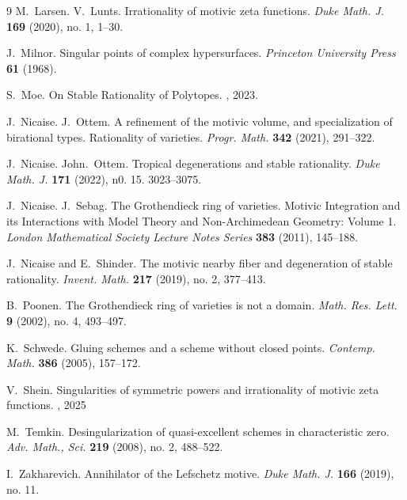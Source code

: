 \documentclass{amsart}
\theoremstyle{definition}
\numberwithin{equation}{section}
\begin{document}
\begin{thebibliography}{9}
M.~Larsen. V.~Lunts. Irrationality of motivic zeta functions. \emph{Duke Math. J.} {\bf 169} (2020), no. 1, 1--30.

J.~Milnor. Singular points of complex hypersurfaces. \emph{Princeton University Press} {\bf 61} (1968).

S.~Moe. On Stable Rationality of Polytopes. , 2023.

J.~Nicaise. J.~Ottem. A refinement of the motivic volume, and specialization of birational types. Rationality of varieties. \emph{Progr. Math.} {\bf 342} (2021), 291--322.

J.~Nicaise. John.~Ottem. Tropical degenerations and stable rationality. \emph{Duke Math. J.} {\bf 171} (2022), n0. 15. 3023--3075.

J.~Nicaise. J.~Sebag. The Grothendieck ring of varieties. Motivic Integration and its Interactions with Model Theory and Non-Archimedean Geometry: Volume 1. \emph{London Mathematical Society Lecture Notes Series} {\bf 383} (2011), 145--188.

J.~Nicaise and E.~Shinder. The motivic nearby fiber and degeneration of stable rationality. \emph{Invent. Math.} {\bf 217} (2019), no. 2, 377--413.

B.~Poonen. The Grothendieck ring of varieties is not a domain. \emph{Math. Res. Lett.} {\bf 9} (2002), no. 4, 493--497.

K.~Schwede. Gluing schemes and a scheme without closed points. \emph{Contemp. Math.} {\bf 386} (2005), 157--172.

V.~Shein.
\newblock Singularities of symmetric powers and irrationality of motivic zeta functions.
, 2025

M.~Temkin. Desingularization of quasi-excellent schemes in characteristic zero. \emph{Adv. Math., Sci.} {\bf 219} (2008), no. 2, 488--522.

I.~Zakharevich. Annihilator of the Lefschetz motive. \emph{Duke Math. J.} {\bf 166} (2019), no. 11.


\end{thebibliography}
\end{document}
